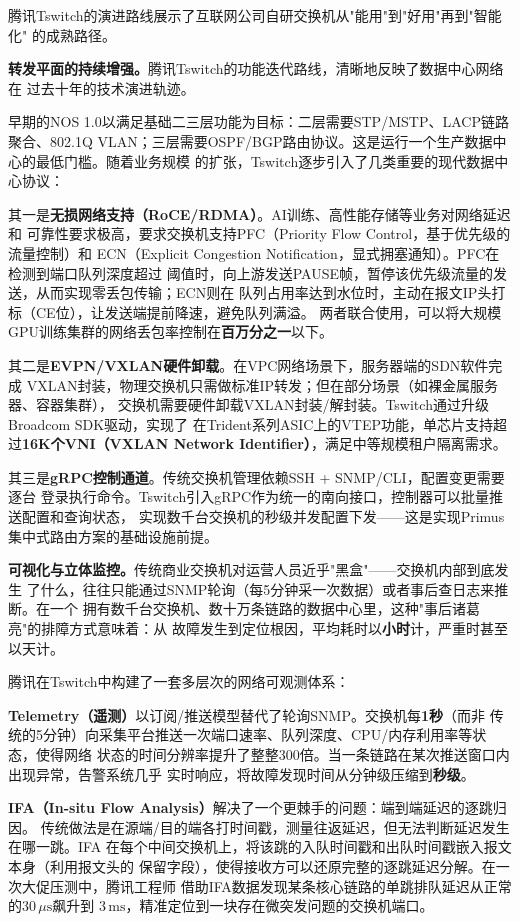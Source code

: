 腾讯Tswitch的演进路线展示了互联网公司自研交换机从"能用"到"好用"再到"智能化"
的成熟路径。

\textbf{转发平面的持续增强。}腾讯Tswitch的功能迭代路线，清晰地反映了数据中心网络在
过去十年的技术演进轨迹。

早期的NOS 1.0以满足基础二三层功能为目标：二层需要STP/MSTP、LACP链路聚合、802.1Q
VLAN；三层需要OSPF/BGP路由协议。这是运行一个生产数据中心的最低门槛。随着业务规模
的扩张，Tswitch逐步引入了几类重要的现代数据中心协议：

其一是\textbf{无损网络支持（RoCE/RDMA）}。AI训练、高性能存储等业务对网络延迟和
可靠性要求极高，要求交换机支持PFC（Priority Flow Control，基于优先级的流量控制）和
ECN（Explicit Congestion Notification，显式拥塞通知）。PFC在检测到端口队列深度超过
阈值时，向上游发送PAUSE帧，暂停该优先级流量的发送，从而实现零丢包传输；ECN则在
队列占用率达到水位时，主动在报文IP头打标（CE位），让发送端提前降速，避免队列满溢。
两者联合使用，可以将大规模GPU训练集群的网络丢包率控制在\textbf{百万分之一}以下。

其二是\textbf{EVPN/VXLAN硬件卸载}。在VPC网络场景下，服务器端的SDN软件完成
VXLAN封装，物理交换机只需做标准IP转发；但在部分场景（如裸金属服务器、容器集群），
交换机需要硬件卸载VXLAN封装/解封装。Tswitch通过升级Broadcom SDK驱动，实现了
在Trident系列ASIC上的VTEP功能，单芯片支持超过\textbf{16K个VNI（VXLAN Network
Identifier）}，满足中等规模租户隔离需求。

其三是\textbf{gRPC控制通道}。传统交换机管理依赖SSH + SNMP/CLI，配置变更需要逐台
登录执行命令。Tswitch引入gRPC作为统一的南向接口，控制器可以批量推送配置和查询状态，
实现数千台交换机的秒级并发配置下发——这是实现Primus集中式路由方案的基础设施前提。

\textbf{可视化与立体监控。}传统商业交换机对运营人员近乎"黑盒"——交换机内部到底发生
了什么，往往只能通过SNMP轮询（每5分钟采一次数据）或者事后查日志来推断。在一个
拥有数千台交换机、数十万条链路的数据中心里，这种"事后诸葛亮"的排障方式意味着：从
故障发生到定位根因，平均耗时以\textbf{小时}计，严重时甚至以天计。

腾讯在Tswitch中构建了一套多层次的网络可观测体系：

\textbf{Telemetry（遥测）}以订阅/推送模型替代了轮询SNMP。交换机每\textbf{1秒}（而非
传统的5分钟）向采集平台推送一次端口速率、队列深度、CPU/内存利用率等状态，使得网络
状态的时间分辨率提升了整整300倍。当一条链路在某次推送窗口内出现异常，告警系统几乎
实时响应，将故障发现时间从分钟级压缩到\textbf{秒级}。

\textbf{IFA（In-situ Flow Analysis）}解决了一个更棘手的问题：端到端延迟的逐跳归因。
传统做法是在源端/目的端各打时间戳，测量往返延迟，但无法判断延迟发生在哪一跳。IFA
在每个中间交换机上，将该跳的入队时间戳和出队时间戳嵌入报文本身（利用报文头的
保留字段），使得接收方可以还原完整的逐跳延迟分解。在一次大促压测中，腾讯工程师
借助IFA数据发现某条核心链路的单跳排队延迟从正常的$30\,\mu\text{s}$飙升到
$3\,\text{ms}$，精准定位到一块存在微突发问题的交换机端口。

